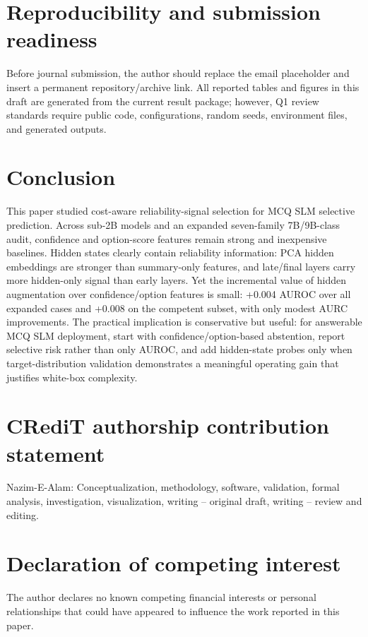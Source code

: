 \documentclass[preprint,12pt,authoryear]{elsarticle}
\begin{document}
\section{Reproducibility and submission readiness}

Before journal submission, the author should replace the email placeholder and insert a permanent repository/archive link. All reported tables and figures in this draft are generated from the current result package; however, Q1 review standards require public code, configurations, random seeds, environment files, and generated outputs.

\section{Conclusion}
This paper studied cost-aware reliability-signal selection for MCQ SLM selective prediction. Across sub-2B models and an expanded seven-family 7B/9B-class audit, confidence and option-score features remain strong and inexpensive baselines. Hidden states clearly contain reliability information: PCA hidden embeddings are stronger than summary-only features, and late/final layers carry more hidden-only signal than early layers. Yet the incremental value of hidden augmentation over confidence/option features is small: +0.004 AUROC over all expanded cases and +0.008 on the competent subset, with only modest AURC improvements. The practical implication is conservative but useful: for answerable MCQ SLM deployment, start with confidence/option-based abstention, report selective risk rather than only AUROC, and add hidden-state probes only when target-distribution validation demonstrates a meaningful operating gain that justifies white-box complexity.

\section*{CRediT authorship contribution statement}
Nazim-E-Alam: Conceptualization, methodology, software, validation, formal analysis, investigation, visualization, writing -- original draft, writing -- review and editing.

\section*{Declaration of competing interest}
The author declares no known competing financial interests or personal relationships that could have appeared to influence the work reported in this paper.
\end{document}
